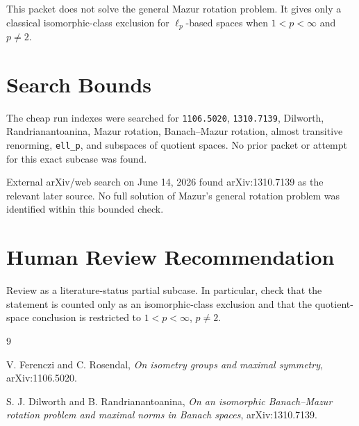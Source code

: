 \documentclass[11pt]{article}
\begin{document}
This packet does not solve the general Mazur rotation problem. It gives only a
classical isomorphic-class exclusion for $\ell_p$-based spaces when
$1<p<\infty$ and $p\ne2$.

\section*{Search Bounds}

The cheap run indexes were searched for \texttt{1106.5020},
\texttt{1310.7139}, Dilworth, Randrianantoanina, Mazur rotation,
Banach--Mazur rotation, almost transitive renorming, \texttt{ell\_p}, and
subspaces of quotient spaces. No prior packet or attempt for this exact
subcase was found.

External arXiv/web search on June 14, 2026 found arXiv:1310.7139 as the
relevant later source. No full solution of Mazur's general rotation problem
was identified within this bounded check.

\section*{Human Review Recommendation}

Review as a literature-status partial subcase. In particular, check that the
statement is counted only as an isomorphic-class exclusion and that the
quotient-space conclusion is restricted to $1<p<\infty$, $p\ne2$.

\begin{thebibliography}{9}

V. Ferenczi and C. Rosendal,
\emph{On isometry groups and maximal symmetry},
arXiv:1106.5020.

S. J. Dilworth and B. Randrianantoanina,
\emph{On an isomorphic Banach--Mazur rotation problem and maximal norms in
Banach spaces},
arXiv:1310.7139.

\end{thebibliography}
\end{document}
